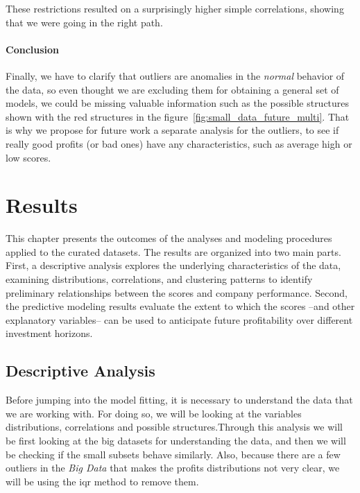 \documentclass[11pt,english,a4paper,hidelinks]{book}
\begin{document}
\noindent These restrictions resulted on a surprisingly higher simple correlations, showing that we were going in the right path.

\subsubsection{Conclusion}

\noindent Finally, we have to clarify that outliers are anomalies in the \textit{normal} behavior of the data, so even thought we are excluding them for obtaining a general set of models, we could be missing valuable information such as the possible structures shown with the red structures in the figure~\ref{fig:small_data_future_multi}. That is why we propose for future work a separate analysis for the outliers, to see if really good profits (or bad ones) have any characteristics, such as average high or low scores.


\chapter{Results}
This chapter presents the outcomes of the analyses and modeling procedures applied to the curated datasets. The results are organized into two main parts. First, a descriptive analysis explores the underlying characteristics of the data, examining distributions, correlations, and clustering patterns to identify preliminary relationships between the scores and company performance. Second, the predictive modeling results evaluate the extent to which the scores --and other explanatory variables-- can be used to anticipate future profitability over different investment horizons.

\section{Descriptive Analysis}

Before jumping into the model fitting, it is necessary to understand the data that we are working with. For doing so, we will be looking at the variables distributions, correlations and possible structures.Through this analysis we will be first looking at the big datasets for understanding the data, and then we will be checking if the small subsets behave similarly. Also, because there are a few outliers in the \textit{Big Data} that makes the profits distributions not very clear, we will be using the \acrshort{iqr} method to remove them.
\end{document}
